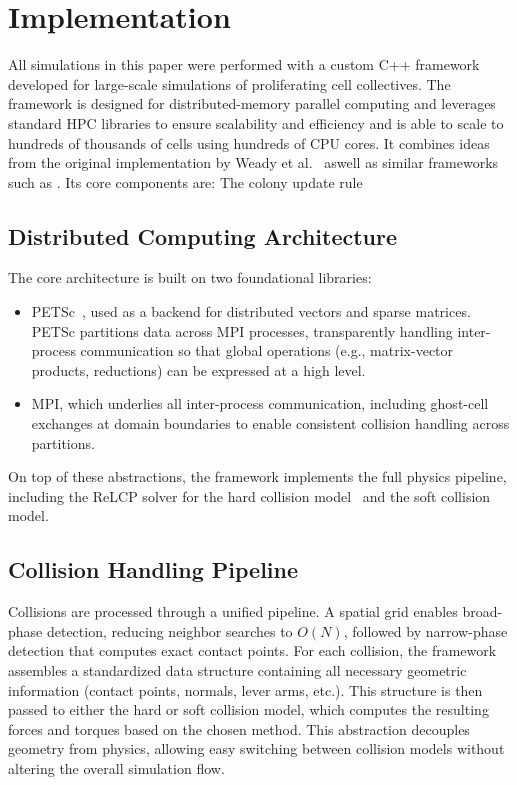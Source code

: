 \documentclass[conference]{IEEEtran}
\begin{document}
\newpage

\section{Implementation}

All simulations in this paper were performed with a custom C++ framework developed for large-scale simulations of proliferating cell collectives. The framework is designed for distributed-memory parallel computing and leverages standard HPC libraries to ensure scalability and efficiency and is able to scale to hundreds of thousands of cells using hundreds of CPU cores. It combines ideas from the original implementation by Weady et al.~\cite{Weady2024SM} aswell as similar frameworks such as \cite{Tasora2008,Yan2019}. Its core components are:
The colony update rule
\subsection{Distributed Computing Architecture}

The core architecture is built on two foundational libraries:
\begin{itemize}
    \item PETSc~\cite{petsc-web-page}, used as a backend for distributed vectors and sparse matrices. PETSc partitions data across MPI processes, transparently handling inter-process communication so that global operations (e.g., matrix-vector products, reductions) can be expressed at a high level.
    \item MPI, which underlies all inter-process communication, including ghost-cell exchanges at domain boundaries to enable consistent collision handling across partitions.
\end{itemize}

On top of these abstractions, the framework implements the full physics pipeline, including the ReLCP solver for the hard collision model~\cite{Weady2024SM} and the soft collision model.


\subsection{Collision Handling Pipeline}

Collisions are processed through a unified pipeline. A spatial grid enables broad-phase detection, reducing neighbor searches to $O(N)$, followed by narrow-phase detection that computes exact contact points. For each collision, the framework assembles a standardized data structure containing all necessary geometric information (contact points, normals, lever arms, etc.). This structure is then passed to either the hard or soft collision model, which computes the resulting forces and torques based on the chosen method. This abstraction decouples geometry from physics, allowing easy switching between collision models without altering the overall simulation flow.
\end{document}
